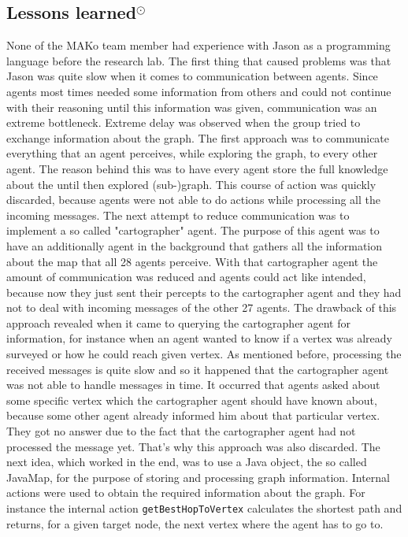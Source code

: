 \subsection{Lessons learned$^{\odot}$}
None of the MAKo team member had experience with Jason as a programming language before the research lab.
The first thing that caused problems was that Jason was quite slow when it comes to communication between agents.
Since agents most times needed some information from others and could not continue with their reasoning until this information was given, communication was an extreme bottleneck.
Extreme delay was observed when the group tried to exchange information about the graph.
The first approach was to communicate everything that an agent perceives, while exploring the graph, to every other agent.
The reason behind this was to have every agent store the full knowledge about the until then explored (sub-)graph.
This course of action was quickly discarded, because agents were not able to do actions while processing all the incoming messages.
The next attempt to reduce communication was to implement a so called "cartographer" agent.
The purpose of this agent was to have an additionally agent in the background that gathers all the information about the map that all 28 agents perceive.
With that cartographer agent the amount of communication was reduced and agents could act like intended, because now they just sent their percepts to the cartographer agent and they had not to deal with incoming messages of the other 27 agents.
The drawback of this approach revealed when it came to querying the cartographer agent for information, for instance when an agent wanted to know if a vertex was already surveyed or how he could reach given vertex.
As mentioned before, processing the received messages is quite slow and so it happened that the cartographer agent was not able to handle messages in time.
It occurred that agents asked about some specific vertex which the cartographer agent should have known about, because some other agent already informed him about that particular vertex.
They got no answer due to the fact that the cartographer agent had not processed the message yet.
That's why this approach was also discarded.
The next idea, which worked in the end, was to use a Java object, the so called JavaMap, for the purpose of storing and processing graph information.
Internal actions were used to obtain the required information about the graph.
For instance the internal action \texttt{getBestHopToVertex} calculates the shortest path and returns, for a given target node, the next vertex where the agent has to go to.
